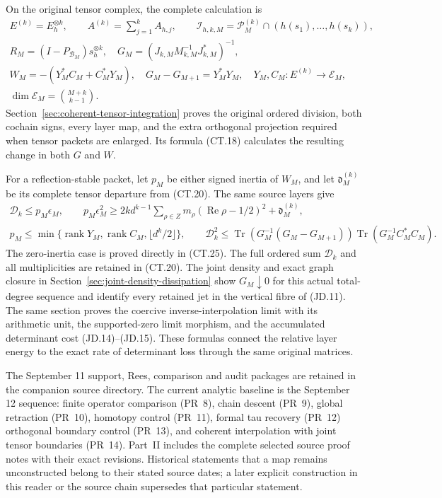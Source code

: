 On the original tensor complex, the complete calculation is
\[
 \begin{gathered}
 E^{(k)}=E_h^{\otimes k},\qquad A^{(k)}=\sum_{j=1}^kA_{h,j},\qquad
 \mathcal I_{h,k,M}=\mathcal P_M^{(k)}
                     \cap(h(s_1),\ldots,h(s_k)),\\
 R_M=(I-P_{\mathcal B_M})s_h^{\otimes k},\quad
 G_M=(J_{k,M}M_{k,M}^{-1}J_{k,M}^*)^{-1},\\
 W_M=-(Y_M^*C_M+C_M^*Y_M),\quad
 G_M-G_{M+1}=Y_M^*Y_M,\quad
 Y_M,C_M:E^{(k)}\longrightarrow\mathcal E_M,\\
 \dim\mathcal E_M=\binom{M+k}{k-1}.
 \end{gathered}
 \tag{R5}
\]
Section~\ref{sec:coherent-tensor-integration} proves the original
ordered division, both cochain signs, every layer map, and the
extra orthogonal projection required when tensor packets are
enlarged.  Its formula (CT.18) calculates the resulting change in
both \(G\) and \(W\).

For a reflection-stable packet, let \(p_M\) be either signed
inertia of \(W_M\), and let \(\mathfrak d_M^{(k)}\) be its
complete tensor departure from (CT.20).  The same source layers give
\[
 \begin{gathered}
 \mathcal D_k\le p_M\epsilon_M,\qquad
 p_M\epsilon_M^2\ge
  2kd^{k-1}\sum_{\rho\in Z}m_\rho
        (\operatorname{Re}\rho-1/2)^2+\mathfrak d_M^{(k)},\\
 p_M\le\min\{\operatorname{rank}Y_M,
              \operatorname{rank}C_M,\lfloor d^k/2\rfloor\},\qquad
 \mathcal D_k^2\le
 \operatorname{Tr}(G_M^{-1}(G_M-G_{M+1}))
 \operatorname{Tr}(G_M^{-1}C_M^*C_M).
 \end{gathered}
 \tag{R6}
\]
The zero-inertia case is proved directly in (CT.25).  The full
ordered sum \(\mathcal D_k\) and all multiplicities are retained
in (CT.20).  The joint density and exact graph closure in
Section~\ref{sec:joint-density-dissipation} show
\(G_M\downarrow0\) for this actual total-degree sequence and
identify every retained jet in the vertical fibre of (JD.11).
The same section proves the coercive inverse-interpolation limit
with its arithmetic unit, the supported-zero limit morphism, and
the accumulated determinant cost (JD.14)--(JD.15).  These formulas
connect the relative layer energy to the exact rate of determinant
loss through the same original matrices.

The September 11 support, Rees, comparison and audit packages
are retained in the companion source directory. The current
analytic baseline is the September 12 sequence: finite operator
comparison (PR~8), chain descent (PR~9), global retraction
(PR~10), homotopy control (PR~11), formal tau recovery (PR~12)
orthogonal boundary control (PR~13), and coherent interpolation
with joint tensor boundaries (PR~14).
Part~II includes the complete selected source proof notes with
their exact revisions. Historical statements that a map remains
unconstructed belong to their stated source dates; a later
explicit construction in this reader or the source chain
supersedes that particular statement.

